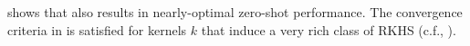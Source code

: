  shows that \opacex also results in nearly-optimal zero-shot performance. The convergence criteria in  is satisfied for kernels $k$ that induce a very rich class of RKHS (c.f., ).

